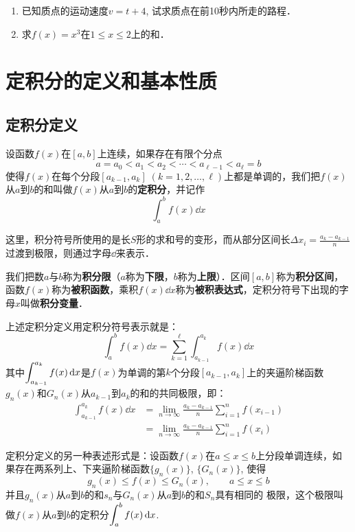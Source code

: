 \begin{ex}
\begin{enumerate}
    \item 已知质点的运动速度$v=t+4$, 试求质点在前10秒内所走的路程．
    \item 求$f(x)=x^3$在$1\le x\le 2$上的和．
\end{enumerate}
\end{ex}


\section{定积分的定义和基本性质}
\subsection{定积分定义}

设函数$f(x)$在$[a,b]$上连续，如果存在有限个分点
\[a=a_0<a_1<a_2<\cdots<a_{\ell-1}<a_{\ell}=b\]
使得$f(x)$在每个分段$[a_{k-1},a_k]\; (k=1, 2,\ldots,\ell)$上都是单调的，我们把$f(x)$从$a$到$b$的和叫做$f(x)$从$a$到$b$的\textbf{定积分}，并记作
\[\int^b_a f(x) \dd x\]

这里，积分符号所使用的是长$S$形的求和号的变形，而从部分区间长$\Delta x_i=\frac{a_k-a_{k-1}}{n}$过渡到极限，则通过字母$\dd$来表示．

我们把数$a$与$b$称为\textbf{积分限}（$a$称为\textbf{下限}，$b$称为\textbf{上限}）．区间$[a,b]$称为\textbf{积分区间}，函数$f(x)$称为\textbf{被积函数}，乘积$f(x)\dd x$称为\textbf{被积表达式}，定积分符号下出现的字母$x$叫做\textbf{积分变量}．

上述定积分定义用定积分符号表示就是：
\[\int^b_a f(x) \dd x=\sum^{\ell}_{k=1}\int^{a_k}_{a_{k-1}}f(x)\dd x\]
其中$\displaystyle\int^{a_k}_{a_{k-1}}f(x)\,{\rm d} x$是$f(x)$为单调的第$k$个分段$[a_{k-1},a_k]$上的夹逼阶梯函数$g_n(x)$和$G_n(x)$从$a_{k-1}$到$a_k$的和的共同极限，即：
\begin{align*}
    \int^{a_k}_{a_{k-1}}f(x)\dd x&=\lim_{n\to \infty}\frac{a_k-a_{k-1}}{n}\sum^n_{i=1}f(x_{i-1})\\
    &=\lim_{n\to \infty}\frac{a_k-a_{k-1}}{n}\sum^n_{i=1}f(x_{i})
\end{align*}

定积分定义的另一种表述形式是：设函数$f(x)$在$a\le x\le b$上分段单调连续，如果存在两系列上、下夹逼阶梯函数$\{g_n(x)\}$, $\{G_n(x)\}$, 使得
\[g_n (x)\le f(x)\le G_n(x),\qquad a\le x\le b\]
并且$g_n(x)$从$a$到$b$的和$s_n$与$G_n(x)$从$a$到$b$的和$S_n$具有相同的
极限，这个极限叫做$f(x)$从$a$到$b$的定积分$\displaystyle\int^b_a f(x) \,{\rm d} x$.

